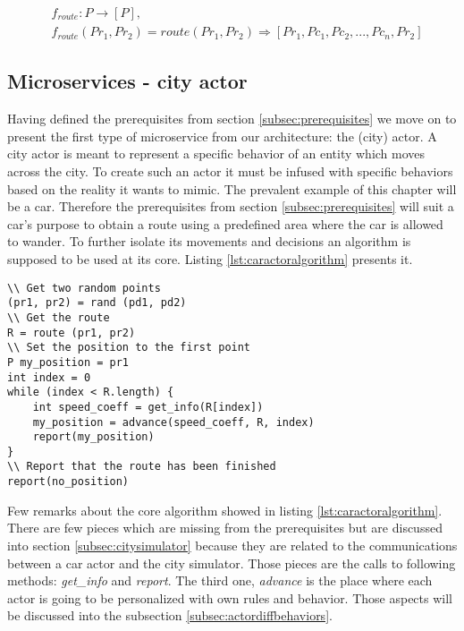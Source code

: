 \documentclass[a4paper,12pt,twoside]{book}
\begin{document}
\begin{equation}
\label{eq:funcroute}
\begin{split}
    & f_{route}: P \rightarrow [P], \\
    & f_{route}(Pr_1, Pr_2) = route (Pr_1, Pr_2) \Rightarrow [Pr_1, Pc_1, Pc_2, ..., Pc_n, Pr_2]
\end{split}
\end{equation}

\subsection{Microservices - city actor}

Having defined the prerequisites from section \ref{subsec:prerequisites} we move on to present the first type of microservice from our architecture: the (city) actor. A city actor is meant to represent a specific behavior of an entity which moves across the city. To create such an actor it must be infused with specific behaviors based on the reality it wants to mimic. The prevalent example of this chapter will be a car. Therefore the prerequisites from section \ref{subsec:prerequisites} will suit a car's purpose to obtain a route using a predefined area where the car is allowed to wander. To further isolate its movements and decisions an algorithm is supposed to be used at its core. Listing \ref{lst:caractoralgorithm} presents it.

\begin{lstlisting}[caption=Basic algorithm for a car actor, label=lst:caractoralgorithm]
\\ Get two random points
(pr1, pr2) = rand (pd1, pd2)
\\ Get the route
R = route (pr1, pr2)
\\ Set the position to the first point
P my_position = pr1
int index = 0
while (index < R.length) {
    int speed_coeff = get_info(R[index])
    my_position = advance(speed_coeff, R, index)
    report(my_position)
}
\\ Report that the route has been finished
report(no_position)
\end{lstlisting}

Few remarks about the core algorithm showed in listing \ref{lst:caractoralgorithm}. There are few pieces which are missing from the prerequisites but are discussed into section \ref{subsec:citysimulator} because they are related to the communications between a car actor and the city simulator. Those pieces are the calls to following methods: \textit{get\_info} and \textit{report}. The third one, \textit{advance} is the place where each actor is going to be personalized with own rules and behavior. Those aspects will be discussed into the subsection \ref{subsec:actordiffbehaviors}.
\end{document}
